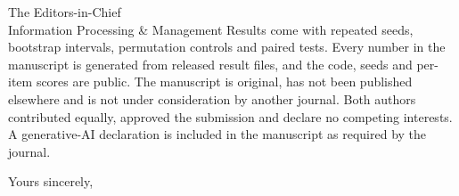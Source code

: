 \documentclass[11pt]{letter}
\begin{document}
\begin{letter}{The Editors-in-Chief\\Information Processing \& Management}
Results come with repeated seeds, bootstrap intervals, permutation controls and paired tests. Every number in the manuscript is generated from released result files, and the code, seeds and per-item scores are public. The manuscript is original, has not been published elsewhere and is not under consideration by another journal. Both authors contributed equally, approved the submission and declare no competing interests. A generative-AI declaration is included in the manuscript as required by the journal.

\closing{Yours sincerely,}
\end{letter}
\end{document}
